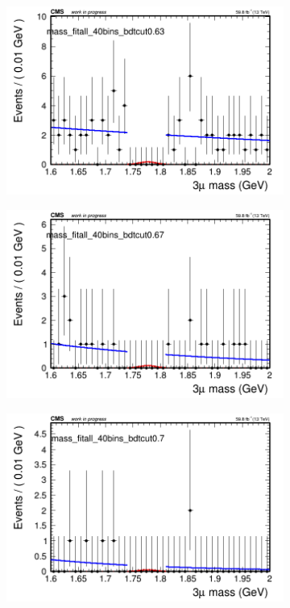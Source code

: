 \begin{figure}[H]
\begin{subfigure}{0.2\textwidth}
        \caption{}
    \end{subfigure}
    \begin{subfigure}{0.2\textwidth}
        \includegraphics[width=\textwidth]{unfixed_exp/plots/all/massfit_all_40bins_bdtcut0.63.png}
        \caption{}
    \end{subfigure}
    \begin{subfigure}{0.2\textwidth}
        \includegraphics[width=\textwidth]{unfixed_exp/plots/all/massfit_all_40bins_bdtcut0.67.png}
        \caption{}
    \end{subfigure}
    \begin{subfigure}{0.2\textwidth}
        \includegraphics[width=\textwidth]{unfixed_exp/plots/all/massfit_all_40bins_bdtcut0.7.png}

\end{subfigure}
\end{figure}
